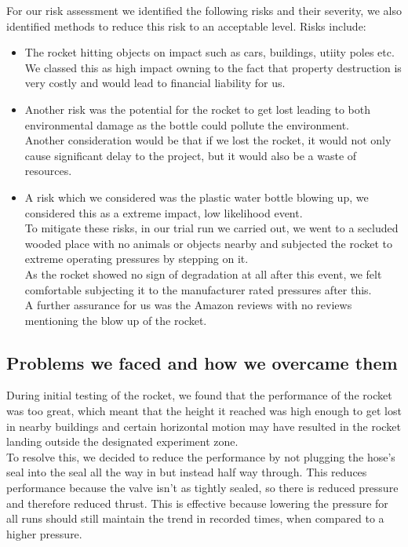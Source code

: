 \documentclass[14pt]{article}
\begin{document}
For our risk assessment we identified the following risks and their severity, we also identified methods to reduce this risk to an acceptable level.
Risks include:
\begin{itemize}
    \item The rocket hitting objects on impact such as cars, buildings, utiity poles etc. \\We classed this as high impact owning to the fact that property destruction is very costly and would lead to financial liability for us.
    \item Another risk was the potential for the rocket to get lost leading to both environmental damage as the bottle could pollute the environment. \\Another consideration would be that if we lost the rocket, it would not only cause significant delay to the project, but it would also be a waste of resources.
    \item A risk which we considered was the plastic water bottle blowing up, we considered this as a extreme impact, low likelihood event. \\ To mitigate these risks, in our trial run we carried out, we went to a secluded wooded place with no animals or objects nearby and subjected the rocket to extreme operating pressures by stepping on it. \\ As the rocket showed no sign of degradation at all after this event, we felt comfortable subjecting it to the manufacturer rated pressures after this. \\ A further assurance for us was the Amazon reviews with no reviews mentioning the blow up of the rocket.

\end{itemize}

\subsection{Problems we faced and how we overcame them}
During initial testing of the rocket, we found that the performance of the rocket was too great, which meant that the height it reached was high enough to get lost in nearby buildings and certain horizontal motion may have resulted in the rocket landing outside the designated experiment zone. 
\\To resolve this, we decided to reduce the performance by not plugging the hose's seal into the seal all the way in but instead half way through. This reduces performance because the valve isn't as tightly sealed, so there is reduced pressure and therefore reduced thrust. This is effective because lowering the pressure for all runs should still maintain the trend in recorded times, when compared to a higher pressure.
\end{document}

